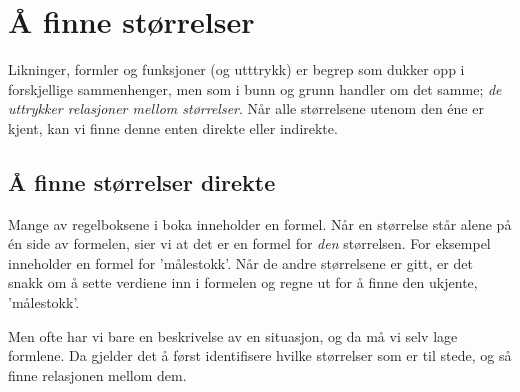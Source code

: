 




\section{Å finne størrelser}
Likninger, formler og funksjoner (og utttrykk) er begrep som dukker opp i forskjellige sammenhenger, men som i bunn og grunn handler om det samme; \textsl{de uttrykker relasjoner mellom størrelser}. Når alle størrelsene utenom den éne er kjent, kan vi finne denne enten direkte eller indirekte.\vsk

\subsection{Å finne størrelser direkte}
Mange av regelboksene i boka inneholder en formel. Når en størrelse står alene på én side av formelen, sier vi at det er en formel for \textsl{den} størrelsen. For eksempel inneholder  en formel for 'målestokk'. Når de andre størrelsene er gitt, er det snakk om å sette verdiene inn i formelen og regne ut for å finne den ukjente,  'målestokk'.  \vsk

Men ofte har vi bare en beskrivelse av en situasjon, og da må vi selv lage formlene. Da gjelder det å først identifisere hvilke størrelser som er til stede, og så finne relasjonen mellom dem.\regv
{}
